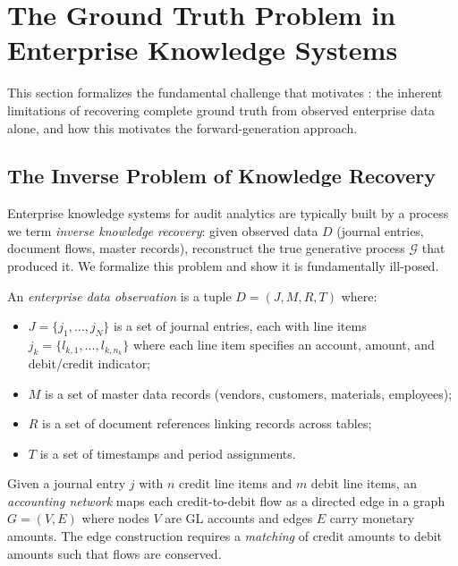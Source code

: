 \section{The Ground Truth Problem in Enterprise Knowledge Systems}
\label{sec:ground_truth}

This section formalizes the fundamental challenge that motivates
\system{}: the inherent limitations of recovering complete ground truth from
observed enterprise data alone, and how this motivates the forward-generation
approach.

\subsection{The Inverse Problem of Knowledge Recovery}
\label{sec:gt_inverse}

Enterprise knowledge systems for audit analytics are typically built by
a process we term \emph{inverse knowledge recovery}: given observed data
$D$ (journal entries, document flows, master records), reconstruct the
true generative process $\mathcal{G}$ that produced it.  We formalize
this problem and show it is fundamentally ill-posed.

\begin{definition}
\label{def:observation}
An \emph{enterprise data observation} is a tuple $D = (J, M, R, T)$
where:
\begin{itemize}
  \item $J = \{j_1, \ldots, j_N\}$ is a set of journal entries, each
    with line items $j_k = \{l_{k,1}, \ldots, l_{k,n_k}\}$ where each
    line item specifies an account, amount, and debit/credit indicator;
  \item $M$ is a set of master data records (vendors, customers,
    materials, employees);
  \item $R$ is a set of document references linking records across tables;
  \item $T$ is a set of timestamps and period assignments.
\end{itemize}
\end{definition}

\begin{definition}
\label{def:accounting_network}
Given a journal entry $j$ with $n$ credit line items and $m$ debit line
items, an \emph{accounting network} maps each credit-to-debit flow as a
directed edge in a graph $G = (V, E)$ where nodes $V$ are GL accounts
and edges $E$ carry monetary amounts.  The edge construction requires
a \emph{matching} of credit amounts to debit amounts such that flows are
conserved.
\end{definition}

